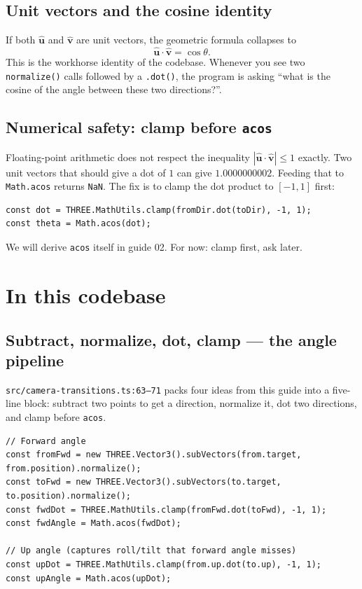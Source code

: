 \documentclass{article}
\begin{document}
\subsection{Unit vectors and the cosine identity}

If both $\hat{\mathbf{u}}$ and $\hat{\mathbf{v}}$ are unit vectors, the
geometric formula collapses to
\[
\hat{\mathbf{u}} \cdot \hat{\mathbf{v}} = \cos\theta.
\]
This is the workhorse identity of the codebase. Whenever you see two
\texttt{normalize()} calls followed by a \texttt{.dot()}, the program is
asking ``what is the cosine of the angle between these two directions?''.

\subsection{Numerical safety: clamp before \texttt{acos}}

Floating-point arithmetic does not respect the inequality $|\hat{\mathbf{u}} \cdot \hat{\mathbf{v}}| \le 1$
exactly. Two unit vectors that should give a dot of $1$ can give $1.0000000002$.
Feeding that to \texttt{Math.acos} returns \texttt{NaN}. The fix is to clamp
the dot product to $[-1, 1]$ first:
\begin{lstlisting}
const dot = THREE.MathUtils.clamp(fromDir.dot(toDir), -1, 1);
const theta = Math.acos(dot);
\end{lstlisting}
We will derive \texttt{acos} itself in guide 02. For now: clamp first, ask
later.

\section{In this codebase}

\subsection{Subtract, normalize, dot, clamp --- the angle pipeline}

\texttt{src/camera-transitions.ts:63--71} packs four ideas from this guide
into a five-line block: subtract two points to get a direction, normalize
it, dot two directions, and clamp before \texttt{acos}.

\begin{lstlisting}
// Forward angle
const fromFwd = new THREE.Vector3().subVectors(from.target, from.position).normalize();
const toFwd = new THREE.Vector3().subVectors(to.target, to.position).normalize();
const fwdDot = THREE.MathUtils.clamp(fromFwd.dot(toFwd), -1, 1);
const fwdAngle = Math.acos(fwdDot);

// Up angle (captures roll/tilt that forward angle misses)
const upDot = THREE.MathUtils.clamp(from.up.dot(to.up), -1, 1);
const upAngle = Math.acos(upDot);
\end{lstlisting}
\end{document}
